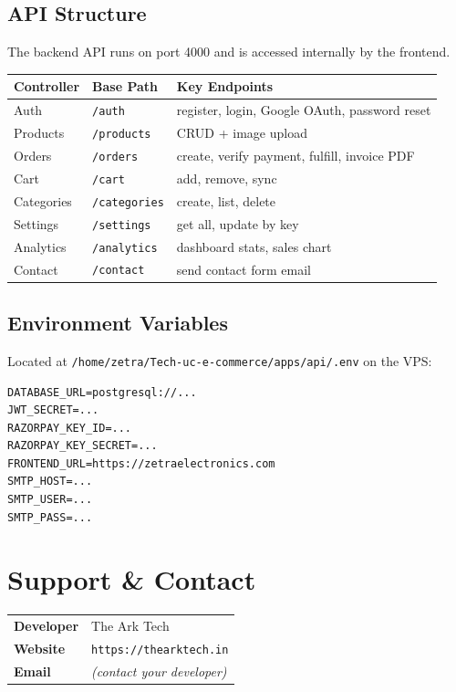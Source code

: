 \documentclass[12pt,a4paper]{article}
\begin{document}
\subsection{API Structure}

The backend API runs on port 4000 and is accessed internally by the frontend.

\begin{tabular}{@{}L{3cm} L{3cm} L{7cm}@{}}
\toprule
\textbf{Controller} & \textbf{Base Path} & \textbf{Key Endpoints} \\
\midrule
Auth & \texttt{/auth} & register, login, Google OAuth, password reset \\
Products & \texttt{/products} & CRUD + image upload \\
Orders & \texttt{/orders} & create, verify payment, fulfill, invoice PDF \\
Cart & \texttt{/cart} & add, remove, sync \\
Categories & \texttt{/categories} & create, list, delete \\
Settings & \texttt{/settings} & get all, update by key \\
Analytics & \texttt{/analytics} & dashboard stats, sales chart \\
Contact & \texttt{/contact} & send contact form email \\
\bottomrule
\end{tabular}

\subsection{Environment Variables}

Located at \texttt{/home/zetra/Tech-uc-e-commerce/apps/api/.env} on the VPS:

\begin{lstlisting}[language={}]
DATABASE_URL=postgresql://...
JWT_SECRET=...
RAZORPAY_KEY_ID=...
RAZORPAY_KEY_SECRET=...
FRONTEND_URL=https://zetraelectronics.com
SMTP_HOST=...
SMTP_USER=...
SMTP_PASS=...
\end{lstlisting}

\section*{Support \& Contact}

\vspace{0.5em}
\begin{tabular}{@{}L{4cm} L{9cm}@{}}
\textbf{Developer} & The Ark Tech \\[0.5em]
\textbf{Website}   & \texttt{https://thearktech.in} \\[0.5em]
\textbf{Email}     & \textit{(contact your developer)} \\
\end{tabular}
\end{document}
